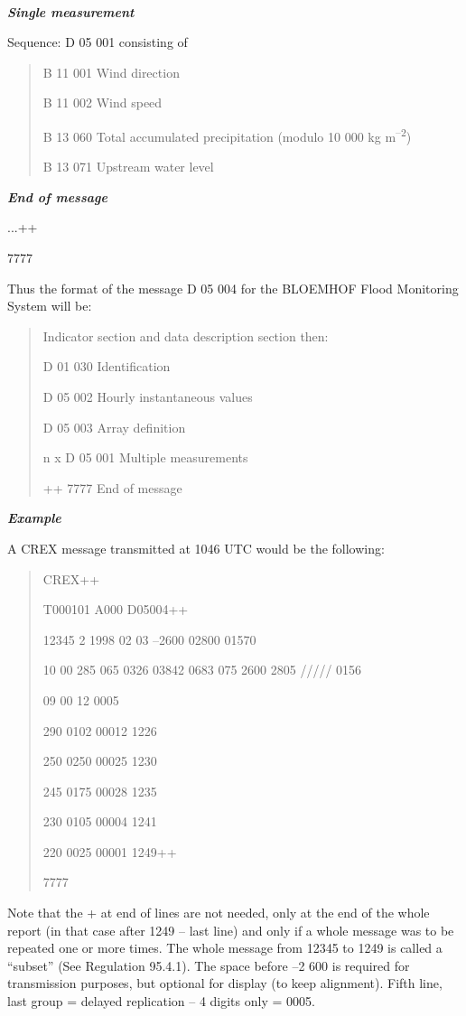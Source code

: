 \emph{\textbf{\\
}}

\emph{\textbf{Single measurement}}

Sequence: D 05 001 consisting of

\begin{quote}
B 11 001 Wind direction

B 11 002 Wind speed

B 13 060 Total accumulated precipitation (modulo 10 000 kg m\textsuperscript{--2})

B 13 071 Upstream water level
\end{quote}

\emph{\textbf{End of message}}

...++

7777

Thus the format of the message D 05 004 for the BLOEMHOF Flood Monitoring System will be:

\begin{quote}
Indicator section and data description section then:

D 01 030 Identification

D 05 002 Hourly instantaneous values

D 05 003 Array definition

n x D 05 001 Multiple measurements

++ 7777 End of message
\end{quote}

\emph{\textbf{Example}}

A CREX message transmitted at 1046 UTC would be the following:

\begin{quote}
CREX++

T000101 A000 D05004++

12345 2 1998 02 03 --2600 02800 01570

10 00 285 065 0326 03842 0683 075 2600 2805 ///// 0156

09 00 12 0005

290 0102 00012 1226

250 0250 00025 1230

245 0175 00028 1235

230 0105 00004 1241

220 0025 00001 1249++

7777
\end{quote}

Note that the + at end of lines are not needed, only at the end of the whole report (in that case after 1249 -- last line) and only if a whole message was to be repeated one or more times. The whole message from 12345 to 1249 is called a ``subset'' (See Regulation 95.4.1). The space before --2 600 is required for transmission purposes, but optional for display (to keep alignment). Fifth line, last group = delayed replication -- 4 digits only = 0005.

